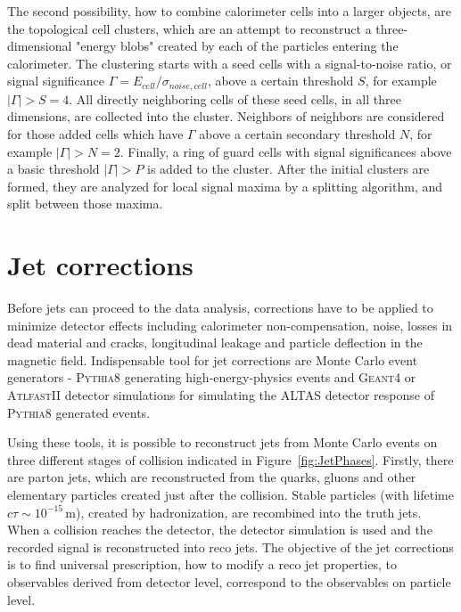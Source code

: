 The second possibility, how to combine calorimeter cells into a larger objects,
are the topological cell clusters, which are an attempt to reconstruct a
three-dimensional "energy blobs" created by each of the particles entering the
calorimeter.  The clustering starts with a seed cells with a signal-to-noise
ratio, or signal significance $\Gamma = E_{cell} / \sigma_{noise,cell}$, above a
certain threshold $S$, for example $|\Gamma| > S = 4$.  All directly neighboring cells
of these seed cells, in all three dimensions, are collected into the cluster.
Neighbors of neighbors are considered for those added cells which have $\Gamma$
above a certain secondary threshold $N$, for example $|\Gamma| > N = 2$. Finally, a ring of
guard cells with signal significances above a basic threshold $|\Gamma| > P$ is
added to the cluster. After the initial clusters are formed, they are analyzed
for local signal maxima by a splitting algorithm, and split between those
maxima.

\section{Jet corrections}

Before jets can proceed to the data analysis, corrections have to be applied to
minimize detector effects including calorimeter non-compensation, noise, losses
in dead material and cracks, longitudinal leakage and particle deflection in the
magnetic field. Indispensable tool for jet corrections are Monte Carlo event
generators - \textsc{Pythia8} \cite{Pythia8} generating high-energy-physics
events and \textsc{Geant4} \cite{Geant4} or \textsc{AtlfastII} \cite{AtlfastII}
detector simulations for simulating the ALTAS detector response of
\textsc{Pythia8} generated events.

Using these tools, it is possible to reconstruct jets from Monte Carlo events on three
different stages of collision indicated in Figure~\ref{fig:JetPhases}. Firstly,
there are parton jets, which are reconstructed from the quarks, gluons and other
elementary particles created just after the collision. Stable particles (with
lifetime $c\tau \sim 10^{-15}\,\text{m}$), created by hadronization, are recombined into
the truth jets. When a collision reaches the detector, the detector simulation
is used and the recorded signal is reconstructed into reco jets.
The objective of the jet corrections is to find universal prescription, how to
modify a reco jet properties, to observables derived from detector level,
correspond to the observables on particle level.

